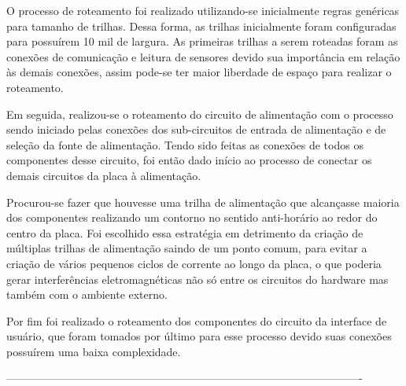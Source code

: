 O processo de roteamento foi realizado utilizando-se inicialmente regras genéricas para tamanho de trilhas. Dessa forma, as trilhas inicialmente foram configuradas para possuírem 10 mil de largura. As primeiras trilhas a serem roteadas foram as conexões de comunicação e leitura de sensores devido sua importância em relação às demais conexões, assim pode-se ter maior liberdade de espaço para realizar o roteamento. 

Em seguida, realizou-se o roteamento do circuito de alimentação com o processo sendo iniciado pelas conexões dos sub-circuitos de entrada de alimentação e de seleção da fonte de alimentação. Tendo sido feitas as conexões de todos os componentes desse circuito, foi então dado início ao processo de conectar os demais circuitos da placa à alimentação.

Procurou-se fazer que houvesse uma trilha de alimentação que alcançasse maioria dos componentes realizando um contorno no sentido anti-horário ao redor do centro da placa. Foi escolhido essa estratégia em detrimento da criação de múltiplas trilhas de alimentação saindo de um ponto comum, para evitar a criação de vários pequenos ciclos de corrente ao longo da placa, o que poderia gerar interferências eletromagnéticas não só entre os circuitos do hardware mas também com o ambiente externo. 

Por fim foi realizado o roteamento dos componentes do circuito da interface de usuário, que foram tomados por último para esse processo devido suas conexões possuírem uma baixa complexidade. 













\iffalse
-------------------------------------------------------------------------------------------------

